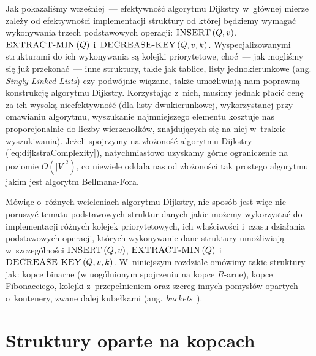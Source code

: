 Jak pokazaliśmy wcześniej~--- efektywność algorytmu Dijkstry w~głównej mierze zależy od efektywności implementacji struktury od której będziemy wymagać wykonywania trzech podstawowych operacji: $\textrm{\textsc{INSERT}} \left( Q, v \right)$, $\textrm{\textsc{EXTRACT-MIN}} \left( Q \right)$ i~$\textrm{\textsc{DECREASE-KEY}} \left( Q, v, k \right)$.
Wyspecjalizowanymi strukturami do ich wykonywania są kolejki priorytetowe, choć~--- jak mogliśmy się już przekonać~--- inne struktury, takie jak tablice, listy jednokierunkowe (ang. \textit{Singly-Linked Lists}) czy podwójnie wiązane, także umożliwiają nam poprawną konstrukcję algorytmu Dijkstry.
Korzystając z~nich, musimy jednak płacić cenę za ich wysoką nieefektywność (dla listy dwukierunkowej, wykorzystanej przy omawianiu algorytmu, wyszukanie najmniejszego elementu kosztuje nas proporcjonalnie do liczby wierzchołków, znajdujących się na niej w~trakcie wyszukiwania).
Jeżeli spojrzymy na złożoność algorytmu Dijkstry (\ref{eq:dijkstraComplexity}), natychmiastowo uzyskamy górne ograniczenie na poziomie $O \left( \left| V \right| ^{2} \right)$, co niewiele oddala nas od złożoności tak prostego algorytmu jakim jest algorytm Bellmana-Fora.

Mówiąc o~różnych wcieleniach algorytmu Dijkstry, nie sposób jest więc nie poruszyć tematu podstawowych struktur danych jakie możemy wykorzystać do implementacji różnych kolejek priorytetowych, ich właściwości i~czasu działania podstawowych operacji, których wykonywanie dane struktury umożliwiają~--- w~szczególności $\textrm{\textsc{INSERT}} \left( Q, v \right)$, $\textrm{\textsc{EXTRACT-MIN}} \left( Q \right)$ i~$\textrm{\textsc{DECREASE-KEY}} \left( Q, v, k \right)$.
W~niniejszym rozdziale omówimy takie struktury jak: kopce binarne (w uogólnionym spojrzeniu na kopce $R$-arne), kopce Fibonacciego, kolejki z~przepełnieniem oraz szereg innych pomysłów opartych o~kontenery, zwane dalej kubełkami (ang. \textit{buckets}~\cite[$4.6$,$4.8$]{Ahuja:1993:NFT:137406}).




\section{Struktury oparte na kopcach}




